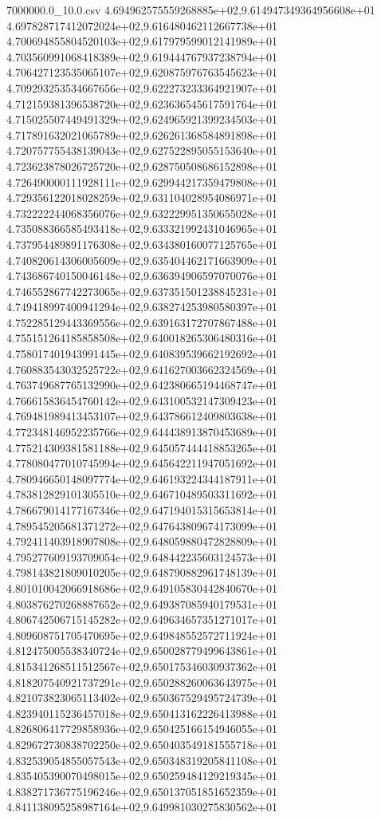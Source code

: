 \begin{filecontents*}{7000000.0_10.0.csv}
4.694962575559268885e+02,9.614947349364956608e+01
4.697828717412072024e+02,9.616480462112667738e+01
4.700694855804520103e+02,9.617979599012141989e+01
4.703560991068418389e+02,9.619444767937238794e+01
4.706427123535065107e+02,9.620875976763545623e+01
4.709293253534667656e+02,9.622273233364921907e+01
4.712159381396538720e+02,9.623636545617591764e+01
4.715025507449491329e+02,9.624965921399234503e+01
4.717891632021065789e+02,9.626261368584891898e+01
4.720757755438139043e+02,9.627522895055153640e+01
4.723623878026725720e+02,9.628750508686152898e+01
4.726490000111928111e+02,9.629944217359479808e+01
4.729356122018028259e+02,9.631104028954086971e+01
4.732222244068356076e+02,9.632229951350655028e+01
4.735088366585493418e+02,9.633321992431046965e+01
4.737954489891176308e+02,9.634380160077125765e+01
4.740820614306005609e+02,9.635404462171663909e+01
4.743686740150046148e+02,9.636394906597070076e+01
4.746552867742273065e+02,9.637351501238845231e+01
4.749418997400941294e+02,9.638274253980580397e+01
4.752285129443369556e+02,9.639163172707867488e+01
4.755151264185858508e+02,9.640018265306480316e+01
4.758017401943991445e+02,9.640839539662192692e+01
4.760883543032525722e+02,9.641627003662324569e+01
4.763749687765132990e+02,9.642380665194468747e+01
4.766615836454760142e+02,9.643100532147309423e+01
4.769481989413453107e+02,9.643786612409803638e+01
4.772348146952235766e+02,9.644438913870453689e+01
4.775214309381581188e+02,9.645057444418853265e+01
4.778080477010745994e+02,9.645642211947051692e+01
4.780946650148097774e+02,9.646193224344187911e+01
4.783812829101305510e+02,9.646710489503311692e+01
4.786679014177167346e+02,9.647194015315653814e+01
4.789545205681371272e+02,9.647643809674173099e+01
4.792411403918907808e+02,9.648059880472828809e+01
4.795277609193709054e+02,9.648442235603124573e+01
4.798143821809010205e+02,9.648790882961748139e+01
4.801010042066918686e+02,9.649105830442840670e+01
4.803876270268887652e+02,9.649387085940179531e+01
4.806742506715145282e+02,9.649634657351271017e+01
4.809608751705470695e+02,9.649848552572711924e+01
4.812475005538340724e+02,9.650028779499643861e+01
4.815341268511512567e+02,9.650175346030937362e+01
4.818207540921737291e+02,9.650288260063643975e+01
4.821073823065113402e+02,9.650367529495724739e+01
4.823940115236457018e+02,9.650413162226413988e+01
4.826806417729858936e+02,9.650425166154946055e+01
4.829672730838702250e+02,9.650403549181555718e+01
4.832539054855057543e+02,9.650348319205841108e+01
4.835405390070498015e+02,9.650259484129219345e+01
4.838271736775196246e+02,9.650137051851652359e+01
4.841138095258987164e+02,9.649981030275830562e+01

\end{filecontents*}
